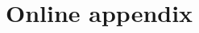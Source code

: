\documentclass[11pt, a4paper]{article}
\begin{document}
    
\section{Online appendix}\label{sec:appendix}
\end{document}
